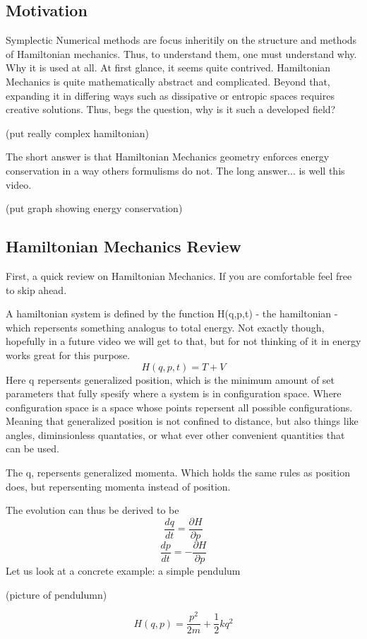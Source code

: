 \subsection{Motivation}
Symplectic Numerical methods are focus inheritily on the structure and methods of Hamiltonian mechanics. Thus, to understand them, one must understand why. Why it is used at all. At first glance, it seems quite contrived. Hamiltonian Mechanics is quite mathematically abstract and complicated. Beyond that, expanding it in differing ways such as dissipative or entropic spaces requires creative solutions. Thus, begs the question, why is it such a developed field?

(put really complex hamiltonian)

The short answer is that Hamiltonian Mechanics geometry enforces energy conservation in a way others formulisms do not. The long answer... is well this video.

(put graph showing energy conservation)
\subsection{Hamiltonian Mechanics Review}
First, a quick review on Hamiltonian Mechanics. If you are comfortable feel free to skip ahead.

A hamiltonian system is defined by the function H(q,p,t) - the hamiltonian - which repersents something analogus to total energy. Not exactly though, hopefully in a future video we will get to that, but for not thinking of it in energy works great for this purpose.
\[
	H(q,p,t) = T + V
\]
Here q repersents generalized position, which is the minimum amount of set parameters that fully spesify where a system is in configuration space. Where configuration space is a space whose points repersent all possible configurations. Meaning that generalized position is not confined to distance, but also things like angles, diminsionless quantaties, or what ever other convenient quantities that can be used.

The q, repersents generalized momenta. Which holds the same rules as position does, but repersenting momenta instead of position.

The evolution can thus be derived to be
\[
	\frac{dq}{dt} = \frac{\partial H}{\partial p}
\]
\[
	\frac{dp}{dt} = -\frac{\partial H}{\partial p}
\]
Let us look at a concrete example: a simple pendulum

(picture of pendulumn)

\[
	H(q,p) = \frac{p^2}{2m} + \frac{1}{2} kq^2
\]

